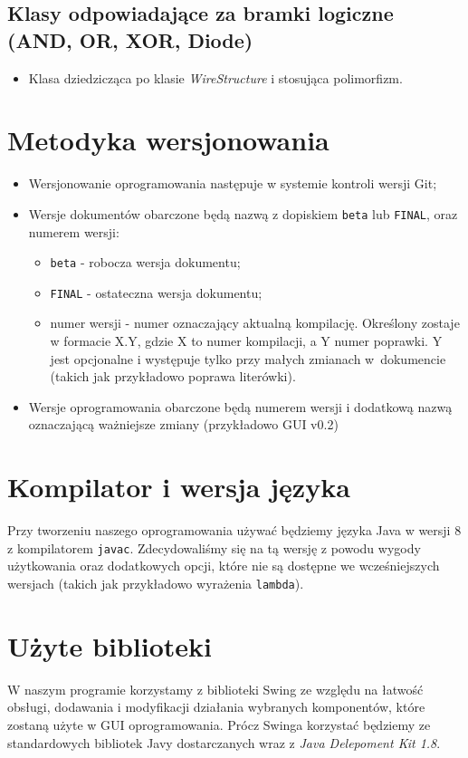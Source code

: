 \documentclass[a4paper,12pt]{article}
\begin{document}
\subsection{Klasy odpowiadające za bramki logiczne (AND, OR, XOR, Diode)}
\begin{itemize}
\item Klasa dziedzicząca po klasie \textit{WireStructure} i stosująca polimorfizm.
\end{itemize}

\section{Metodyka wersjonowania}
\begin{itemize}
\item Wersjonowanie oprogramowania następuje w systemie kontroli wersji Git;
\item Wersje dokumentów obarczone będą nazwą z dopiskiem \texttt{beta} lub \texttt{FINAL}, oraz numerem wersji:
	\begin{itemize}
	\item \texttt{beta} - robocza wersja dokumentu;
	\item \texttt{FINAL} - ostateczna wersja dokumentu;
	\item numer wersji - numer oznaczający aktualną kompilację. Określony zostaje w formacie X.Y, gdzie X to numer kompilacji, a Y numer poprawki. Y jest opcjonalne i występuje tylko przy małych zmianach w~dokumencie (takich jak przykładowo poprawa literówki).
	\end{itemize}
\item Wersje oprogramowania obarczone będą numerem wersji i dodatkową nazwą oznaczającą ważniejsze zmiany (przykładowo GUI v0.2)
\end{itemize}

\section{Kompilator i wersja języka}
Przy tworzeniu naszego oprogramowania używać będziemy języka Java w wersji 8 z kompilatorem \texttt{javac}. Zdecydowaliśmy się na tą wersję z powodu wygody użytkowania oraz dodatkowych opcji, które nie są dostępne we wcześniejszych wersjach (takich jak przykładowo wyrażenia \texttt{lambda}).

\section{Użyte biblioteki}
W naszym programie korzystamy z biblioteki Swing ze względu na łatwość obsługi, dodawania i modyfikacji działania wybranych komponentów, które zostaną użyte w GUI oprogramowania. Prócz Swinga korzystać będziemy ze standardowych bibliotek Javy dostarczanych wraz z \textit{Java Delepoment Kit 1.8}.
\end{document}
